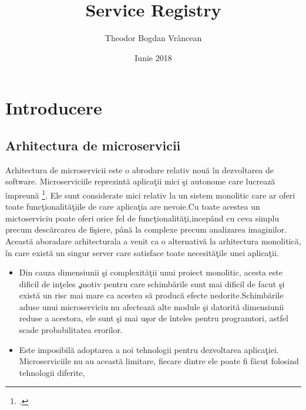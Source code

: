 \documentclass[a4paper,12pt]{report}
\title{Service Registry}
\author{Theodor Bogdan Vr\^ancean}
\date {Iunie 2018}
\begin{document}
\maketitle 
\chapter{Introducere} 
\section{Arhitectura de microservicii}

Arhitectura de microservicii este o abrodare relativ nou\u a \^ in dezvoltarea de software.
Microserviciile reprezint\u a aplica\c tii mici \c si autonome care lucreaz\u a \^ impreun\u a 
\footcite{buildingMicroservices}. Ele sunt considerate mici relativ la un sistem monolitic care ar
oferi toate func\c tionalit\u a\c tiile de care aplica\c tia are nevoie.Cu toate acestea un mictoserviciu poate oferi orice
fel de func\c tionalit\u a\c ti,incep\^and cu ceva simplu precum desc\u arcarea de fi\c siere, p\^an\u a la 
 complexe precum analizarea imaginilor.
 Aceast\u a aboradare arhitecturala a venit ca o alternativ\u a la arhitectura monolitic\u a, \^in care exist\u a 
 un singur server care satisface toate necesit\u a\c tile unei aplica\c tii.
 \begin{itemize}
     \item Din cauza dimensiunii \c si complexit\u a\c tii unui proiect monolitic,
    acesta este dificil de in\c teles \c ,motiv pentru care schimb\u arile sunt mai dificil de facut \c si exist\u a 
    un risc mai mare ca acestea s\u a produc\u a efecte nedorite.Schimb\u arile aduse unui microserviciu nu afecteaz\u a alte
    module \c si datorit\u a dimensiunii reduse a acestora, ele sunt \c si mai u\c sor de \^inteles pentru programtori, astfel 
    scade probabilitatea erorilor.
    \item Este imposibil\u a adoptarea a noi tehnologii pentru dezvoltarea aplica\c tiei. 
    Microserviciile nu au aceast\u a limitare, fiecare dintre ele poate fi f\u acut folosind tehnologii diferite,
    

\end{itemize}
\end{document}
